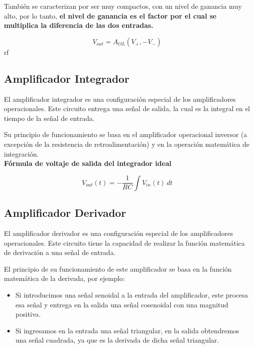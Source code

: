 \documentclass[conference]{IEEEtran}
\begin{document}
También se caracterizan por ser muy compactos, con un nivel de ganancia muy alto, por lo tanto, \textbf{el nivel de ganancia es el factor por el cual se multiplica la diferencia de las dos entradas.}

\begin{equation}
	V_{out} = A_{OL}(V_+, - V_-)
	\label{eq:amplificador}
\end{equation}
rf

\subsection{Amplificador Integrador}

El amplificador integrador es una configuración especial de los amplificadores operacionales. Este circuito entrega una señal de salida, la cual es la integral en el tiempo de la señal de entrada.

Su principio de funcionamiento se basa en el amplificador operacional inversor (a excepción de la resistencia de retroalimentación) y en la operación matemática de integración.\\

\textbf{Fórmula de voltaje de salida del integrador ideal}

\begin{equation}
V_{out}(t) = -\frac{1}{RC}\int V_{in}(t)\,dt
\label{eq:integrador}
\end{equation}

\subsection{Amplificador Derivador}
El amplificador derivador es una configuración especial de los amplificadores operacionales. Este circuito tiene la capacidad de realizar la función matemática de derivación a una señal de entrada.

El principio de su funcionamiento de este amplificador se basa en la función matemática de la derivada, por ejemplo: 
\begin{itemize}
	\item Si introducimos una señal senoidal a la entrada del amplificador, este procesa esa señal y entrega en la salida una señal cosenoidal con una magnitud positiva.
	
	\item Si ingresamos en la entrada una señal triangular, en la salida obtendremos una señal cuadrada, ya que es la derivada de dicha señal triangular.\\
\end{itemize}
\end{document}

